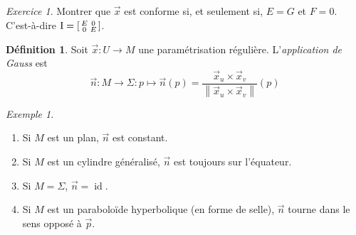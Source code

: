 \documentclass{report}
\theoremstyle{definition}
\newtheorem*{dfn}{D\'efinition}
\theoremstyle{remark}
\newtheorem*{exem}{Exemple}
\newtheorem*{exer}{Exercice}
\def\pff{\operatorname{I}}
\newcommand*{\norme}[1]{\left\|#1\right\|}
\begin{document}
	\begin{exer}
		Montrer que $\vec x$ est conforme si, et seulement si, $E=G$ et $F=0$. C'est-\`a-dire $\pff=\begin{bsmallmatrix}
			E&0\\0&E
		\end{bsmallmatrix}$.
	\end{exer}

	\begin{dfn}
		Soit $\vec x:U\to M$ une param\'etrisation r\'eguli\`ere. L'\emph{application de Gauss} est \[ \vec n : M\to\Sigma : p\mapsto\vec n(p)=\frac{\vec x_u\times\vec x_v}{\norme{\vec x_u\times\vec x_v}}(p) \]
	\end{dfn}

	\begin{exem}
		\begin{enumerate}
			\item Si $M$ est un plan, $\vec n$ est constant.
			\item Si $M$ est un cylindre g\'en\'eralis\'e, $\vec n$ est toujours sur l'\'equateur.
			\item Si $M=\Sigma$, $\vec n=\operatorname{id}$.
			\item Si $M$ est un parabolo\"ide hyperbolique (en forme de selle), $\vec n$ tourne dans le sens oppos\'e \`a $\vec p$.
		\end{enumerate}
	\end{exem}
\end{document}
